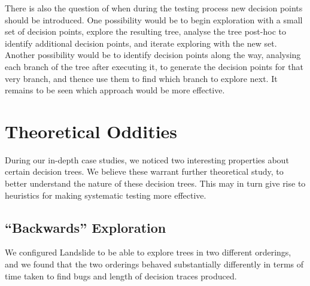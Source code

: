 There is also the question of when during the testing process new decision points should be introduced.
One possibility would be to begin exploration with a small set of decision points, explore the resulting tree, analyse the tree post-hoc to identify additional decision points, and iterate exploring with the new set.
Another possibility would be to identify decision points along the way, analysing each branch of the tree after executing it, to generate the decision points for that very branch, and thence use them to find which branch to explore next.
It remains to be seen which approach would be more effective.


\section{Theoretical Oddities}
\label{sec:future-theory}

During our in-depth case studies, we noticed two interesting properties about certain decision trees. We believe these warrant further theoretical study, to better understand the nature of these decision trees. This may in turn give rise to heuristics for making systematic testing more effective.

\subsection{``Backwards'' Exploration}
\label{sec:future-backwards}

We configured Landslide to be able to explore trees in two different orderings, and we found that the two orderings behaved substantially differently in terms of time taken to find bugs and length of decision traces produced.


